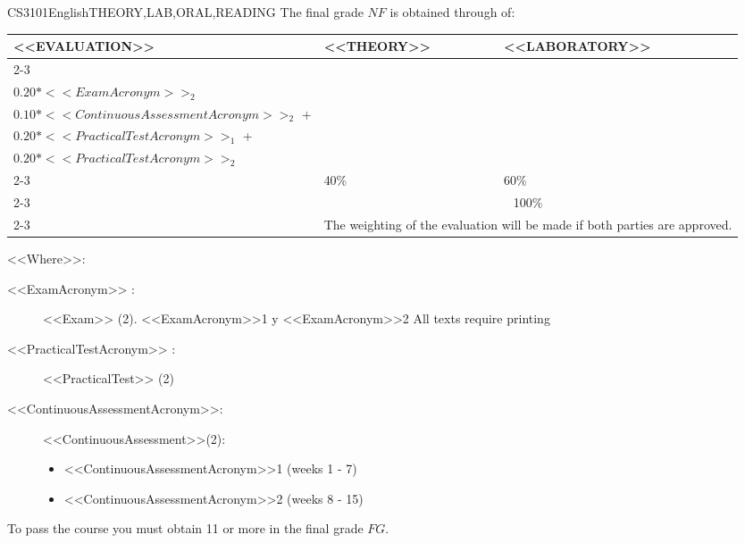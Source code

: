   \begin{evaluation}{CS3101}{English}{THEORY,LAB,ORAL,READING}
  The final grade $NF$ is obtained through of:\\
 
  \begin{tabularx}{0.9\textwidth}{|X|p{}|p{}|} \hline
    \multirow{4}{*}{\uppercase{<<Evaluation>>}} & \uppercase{<<Theory>>} & \uppercase{<<Laboratory>>} \\ \cline{2-3}
    & %
        \begin{minipage}{0.95\textwidth}
        \begin{tabular}{l}
          $0.20*<<ExamAcronym>>_{1}$  + \\
          $0.20*<<ExamAcronym>>_{2}$ 
        \end{tabular} 
        \end{minipage} 
    & %
        \begin{minipage}{0.95\textwidth}
        \begin{tabular}{l}
          $0.10*<<ContinuousAssessmentAcronym>>_{1}$  + \\
          $0.10*<<ContinuousAssessmentAcronym>>_{2}$  + \\
          $0.20*<<PracticalTestAcronym>>_{1}$  +  \\
          $0.20*<<PracticalTestAcronym>>_{2}$
        \end{tabular} 
        \end{minipage}                 \\ \cline{2-3}
    
    & %
    40\% 
    & %
    60\% \\ \cline{2-3}
    & \multicolumn{2}{|c|}{100\%}  \\ \cline{2-3}
    & \multicolumn{2}{|c|}{The weighting of the evaluation will be made if both parties are approved.}  \\ \hline
    \end{tabularx}
      
    \vspace{2mm}
    \noindent <<Where>>:
    \begin{description}
      \item[<<ExamAcronym>> :] <<Exam>> (2). <<ExamAcronym>>1 y <<ExamAcronym>>2  All texts require printing
      \item[<<PracticalTestAcronym>> :] <<PracticalTest>> (2)
      \item[<<ContinuousAssessmentAcronym>>:]<<ContinuousAssessment>>(2):
        \begin{itemize}
          \item <<ContinuousAssessmentAcronym>>1 (weeks 1 - 7) 
            \item <<ContinuousAssessmentAcronym>>2 (weeks 8 - 15)
        \end{itemize}
    \end{description}

   \noindent To pass the course you must obtain 11 or more in the final grade $FG$.
  \end{evaluation}


